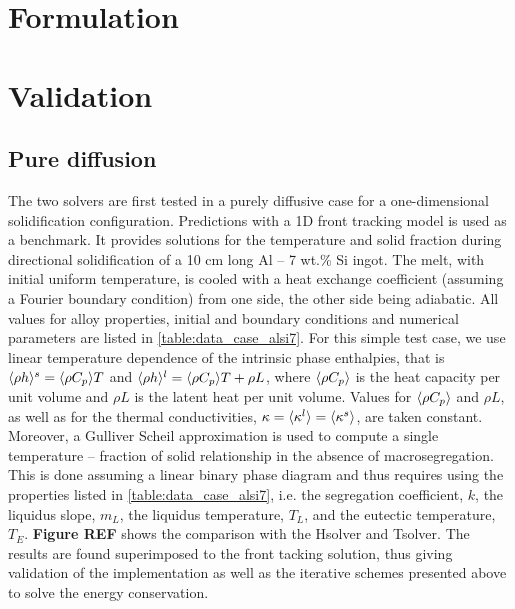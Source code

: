 \section{Formulation}

\section{Validation}

\subsection{Pure diffusion}
The two solvers are first tested in a purely diffusive case for a one-dimensional solidification configuration. 
Predictions with a 1D front tracking model \cite{gandin_constrained_2000} is used as a benchmark. It provides 
solutions for the temperature and solid fraction during directional solidification of a 10 cm long Al – 7 wt.\% Si 
ingot. The melt, with initial uniform temperature, is cooled with a heat exchange coefficient (assuming a Fourier 
boundary condition) from one side, the other side being adiabatic. All values for alloy properties, initial and 
boundary conditions and numerical parameters are listed in \autoref{table:data_case_alsi7}. For this simple test case, 
we use linear temperature dependence of the intrinsic phase enthalpies, that is $\langle  \rho h  \rangle^s= \langle  \rho C_p  \rangle T$ and $\langle  \rho h  \rangle^l= \langle  \rho C_p  \rangle T + \rho L$, 
where $\langle  \rho C_p  \rangle$ is the heat capacity per unit volume and $\rho L$ is the latent heat per unit volume. Values for $\langle  \rho C_p  \rangle$ 
and $\rho L$, as well as for the thermal conductivities, $\kappa = \langle \kappa^l \rangle = \langle \kappa^s \rangle$, are taken constant. Moreover, a 
Gulliver Scheil approximation is used to compute a single temperature – fraction of solid relationship in the 
absence of macrosegregation. This is done assuming a linear binary phase diagram and thus requires using the 
properties listed in \autoref{table:data_case_alsi7}, i.e. the segregation coefficient, $k$, the liquidus slope, $m_L$, the 
liquidus temperature, $T_L$, and the eutectic temperature, $T_E$. \textbf{Figure REF} shows the comparison with 
the Hsolver and Tsolver. The results are found superimposed to the front tacking solution, thus giving validation 
of the implementation as well as the iterative schemes presented above to solve the energy conservation.


